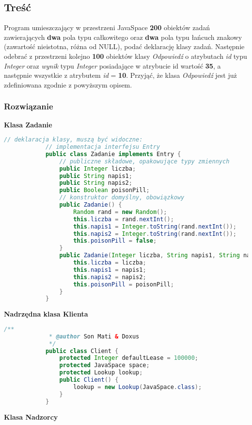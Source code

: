 	\subsection{Treść}
			Program umieszczający w przestrzeni JavaSpace \textbf{200} obiektów zadań zawierających \textbf{dwa} pola typu całkowitego oraz \textbf{dwa} pola typu łańcuch znakowy (zawartość nieistotna, różna od NULL), podać deklarację klasy zadań. Następnie odebrać z przestrzeni kolejno \textbf{100} obiektów klasy \textit{Odpowiedź} o atrybutach \textit{id} typu \textit{Integer} oraz \textit{wynik} typu \textit{Integer} posiadające w atrybucie id wartość \textbf{35}, a następnie wszystkie z atrybutem \textit{id} = \textbf{10}. Przyjąć, że klasa \textit{Odpowiedź} jest już zdefiniowana zgodnie z powyższym opisem.
	
	\subsubsection{Rozwiązanie}
			\textbf{Klasa Zadanie}
			\begin{lstlisting}[language=Java]
			// deklaracja klasy, muszą być widoczne:
			// implementacja interfejsu Entry
			public class Zadanie implements Entry {
				// publiczne składowe, opakowujące typy zmiennych
				public Integer liczba;
				public String napis1;
				public String napis2;
				public Boolean poisonPill;
				// konstruktor domyślny, obowiązkowy
				public Zadanie() {
					Random rand = new Random();
					this.liczba = rand.nextInt();
					this.napis1 = Integer.toString(rand.nextInt());
					this.napis2 = Integer.toString(rand.nextInt());
					this.poisonPill = false;
				}
				public Zadanie(Integer liczba, String napis1, String napis2, Boolean poisonPill) {
					this.liczba = liczba;
					this.napis1 = napis1;
					this.napis2 = napis2;
					this.poisonPill = poisonPill;
				}
			}
			\end{lstlisting}
			\textbf{Nadrzędna klasa Klienta}
			\begin{lstlisting}[language=Java]
			/**
			 * @author Son Mati & Doxus
			 */
			public class Client {
				protected Integer defaultLease = 100000;
				protected JavaSpace space;
				protected Lookup lookup;
				public Client() {
					lookup = new Lookup(JavaSpace.class);
				}
			}
			\end{lstlisting}
			\newpage
			\textbf{Klasa Nadzorcy}
